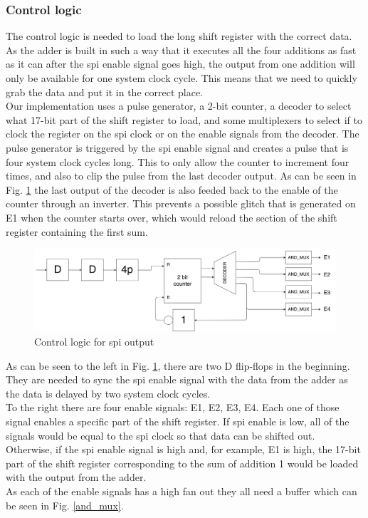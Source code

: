 \newpage

\subsubsection{Control logic}
The control logic is needed to load the long shift register with the correct data. \\
As the adder is built in such a way that it executes all the four additions as fast as it can after the spi enable signal goes high, the output from one addition will only be available for one system clock cycle. This means that we need to quickly grab the data and put it in the correct place.\\ 
Our implementation uses a pulse generator, a 2-bit counter, a decoder to select what 17-bit part of the shift register to load, and some multiplexers to select if to clock the register on the spi clock or on the enable signals from the decoder. The pulse generator is triggered by the spi enable signal and creates a pulse that is four system clock cycles long. This to only allow the counter to increment four times, and also to clip the pulse from the last decoder output. As can be seen in Fig. \ref{spi_out} the last output of the decoder is also feeded back to the enable of the counter through an inverter. This prevents a possible glitch that is generated on E1 when the counter starts over, which would reload the section of the shift register containing the first sum. \\

\begin{figure}[H]
\centering
\captionsetup{justification=centering}
\includegraphics[scale=0.075]{../figures/spi_control.png}
\caption{Control logic for spi output}
\label{spi_out}
\end{figure}

\raggedright As can be seen to the left in Fig. \ref{spi_out}, there are two D flip-flops in the beginning. They are needed to sync the spi enable signal with the data from the adder as the data is delayed by two system clock cycles.\\
To the right there are four enable signals: E1, E2, E3, E4. Each one of those signal enables a specific part of the shift register. If spi enable is low, all of the signals would be equal to the spi clock so that data can be shifted out. Otherwise, if the spi enable signal is high and, for example, E1 is high, the 17-bit part of the shift register corresponding to the sum of addition 1 would be loaded with the output from the adder. \\
As each of the enable signals has a high fan out they all need a buffer which can be seen in Fig. \ref{and_mux}.

